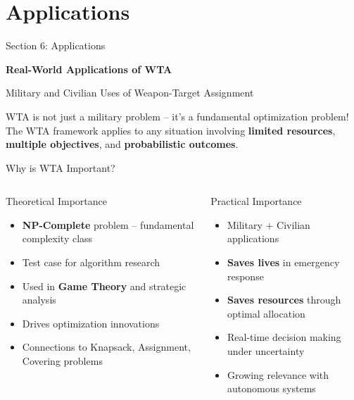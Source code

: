 \documentclass[aspectratio=43,8pt]{beamer}
\begin{document}
\section{Applications}

\begin{frame}{Section 6: Applications}
\begin{center}
{\Large\textcolor{primaryblue}{\textbf{Real-World Applications of WTA}}}

\vspace{0.5cm}
{\normalsize Military and Civilian Uses of Weapon-Target Assignment}
\end{center}

\vspace{0.3cm}
\begin{block}{WTA is not just a military problem -- it's a fundamental optimization problem!}
The WTA framework applies to any situation involving \textbf{limited resources}, \textbf{multiple objectives}, and \textbf{probabilistic outcomes}.
\end{block}
\end{frame}

\begin{frame}{Why is WTA Important?}
\begin{columns}[t]
\begin{alertblock}{Theoretical Importance}
\begin{itemize}
    \item \textbf{NP-Complete} problem -- fundamental complexity class
    \item Test case for algorithm research
    \item Used in \textbf{Game Theory} and strategic analysis
    \item Drives optimization innovations
    \item Connections to Knapsack, Assignment, Covering problems
\end{itemize}
\end{alertblock}

\begin{exampleblock}{Practical Importance}
\begin{itemize}
    \item Military + Civilian applications
    \item \textbf{Saves lives} in emergency response
    \item \textbf{Saves resources} through optimal allocation
    \item Real-time decision making under uncertainty
    \item Growing relevance with autonomous systems
\end{itemize}
\end{exampleblock}
\end{columns}
\end{frame}
\end{document}
